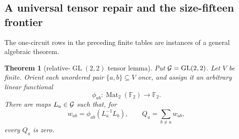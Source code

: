 \documentclass[11pt]{article}
\newtheorem{theorem}{Theorem}[section]
\theoremstyle{definition}
\theoremstyle{remark}
\newcommand{\F}{\mathbb F}
\begin{document}
\subsection{A universal tensor repair and the size-fifteen frontier}

The one-circuit rows in the preceding finite tables are instances of a
general algebraic theorem.

\begin{theorem}[relative-\(\operatorname{GL}(2,2)\) tensor lemma]
\label{thm:tensor}
Put \({\cal G}=\operatorname{GL}(2,2)\).  Let \(V\) be finite.  Orient
each unordered pair \(\{a,b\}\subseteq V\) once, and assign it an
arbitrary linear functional
\[
             \phi_{ab}:\operatorname{Mat}_2(\F_2)\longrightarrow\F_2.
\]
There are maps \(L_a\in{\cal G}\) such that, for
\[
 w_{ab}=\phi_{ab}(L_a^{-1}L_b),\qquad
 Q_a=\sum_{b\ne a}w_{ab},                               \tag{26}
\]
every \(Q_a\) is zero.
\end{theorem}
\end{document}
